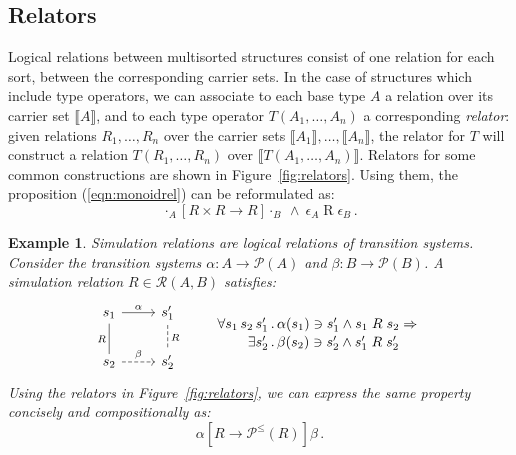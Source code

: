 \documentclass[11pt,oneside,draft]{book}
\newtheorem{example}[theorem]{Example}
\theoremstyle{definition}
\newcommand{\ifr}[1]{\mathrel{[{#1}]}}
\begin{document}
\subsection{Relators} \label{sec:relators} %

Logical relations between multisorted structures
consist of one relation for each sort,
between the corresponding carrier sets.
In the case of structures which include type operators,
we can associate to each base type $A$
a relation over its carrier set $\llbracket A \rrbracket$,
and to each type operator $T(A_1, \ldots, A_n)$
a corresponding \emph{relator}:
given relations $R_1, \ldots, R_n$ over
the carrier sets $\llbracket A_1 \rrbracket, \ldots, \llbracket A_n \rrbracket$,
the relator for $T$
will construct a relation $T(R_1, \ldots, R_n)$
over $\llbracket T(A_1, \ldots, A_n) \rrbracket$.
Relators for some common constructions are shown in Figure~\ref{fig:relators}.
Using them, the proposition (\ref{eqn:monoidrel}) can be reformulated as:
\[
  \cdot_A \ifr{R \times R \rightarrow R} \cdot_B
  \: \wedge \:
  \epsilon_A \mathrel{R} \epsilon_B \,.
\]

\begin{example} \label{ex:simrel} %
Simulation relations are
logical relations of transition systems.
Consider the transition systems
$\alpha : A \rightarrow \mathcal{P}(A)$ and
$\beta : B \rightarrow \mathcal{P}(B)$.
A simulation relation $R \in \mathcal{R}(A, B)$
satisfies:
\[
  \begin{tikzcd}[scale=0.8]
    s_1 \arrow[r, "\alpha"]
        \arrow[d, dash, "R"'] &
    s_1' \arrow[d, dashed, dash, "R"] \\
    s_2 \arrow[r, dashed, "\beta"] &
    s_2'
  \end{tikzcd}
  \qquad
  \label{eqn:simrel}
  \begin{array}{r@{\,.\,}l}
    \forall s_1 \, s_2 \, s_1' &
      \alpha(s_1) \ni s_1' \wedge s_1 \mathrel{R} s_2 \Rightarrow
    \\[0.25ex]
    \exists s_2' &
      \beta(s_2) \ni s_2' \wedge s_1' \mathrel{R} s_2'
  \end{array}
\]
Using the relators in Figure~\ref{fig:relators},
we can express the same property
concisely and compositionally as:
\[
  \alpha \ifr{R \rightarrow \mathcal{P}^\le(R)} \beta \,.
\]
\end{example}
\end{document}
